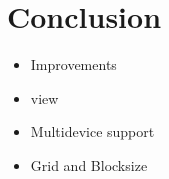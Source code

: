 \section{Conclusion}
\begin{itemize}
	\item Improvements
	\item view
	\item Multidevice support
	\item Grid and Blocksize
\end{itemize}